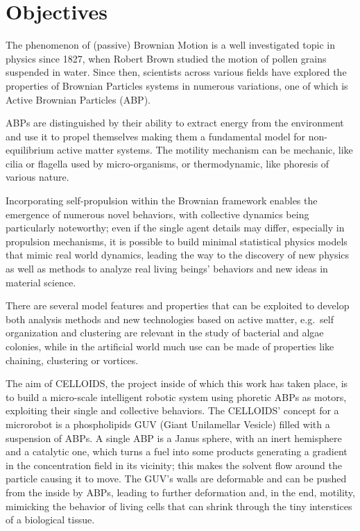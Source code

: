 \documentclass[../main.tex]{subfiles}
\begin{document}
	\section{Objectives}
	
	The phenomenon of (passive) Brownian Motion is a well investigated topic in physics since 1827, when Robert Brown studied the motion of pollen grains suspended in water.
	Since then, scientists across various fields have explored the properties of Brownian Particles systems in numerous variations, one of which is Active Brownian Particles (ABP). 
	
	ABPs are distinguished by their ability to extract energy from the environment and use it to propel themselves making them a fundamental model for non-equilibrium active matter systems.	
	The motility mechanism can be mechanic, like cilia or flagella used by micro-organisms, or thermodynamic, like phoresis of various nature. 
	
	Incorporating self-propulsion within the Brownian framework enables the emergence of numerous novel behaviors, with collective dynamics being particularly noteworthy; even if the single agent details may differ, especially in propulsion mechanisms, it is possible to build minimal statistical physics models that mimic real world dynamics, leading the way to the discovery of new physics as well as methods to analyze real living beings' behaviors and new ideas in material science. 
	
	There are several model features and properties that can be exploited to develop both analysis methods and new technologies based on active matter, e.g.\ self organization and clustering are relevant in the study of bacterial and algae colonies, while in the artificial world much use can be made of properties like chaining, clustering or vortices.
	
	The aim of CELLOIDS, the project inside of which this work has taken place, is to build a micro-scale intelligent robotic system using phoretic ABPs as motors, exploiting their single and collective behaviors. The CELLOIDS’ concept for a microrobot is a phospholipids GUV (Giant Unilamellar Vesicle) filled with a suspension of ABPs. A single ABP is a Janus sphere, with an inert hemisphere and a catalytic one, which turns a fuel into some products generating a gradient in the concentration field in its vicinity; this makes the solvent flow around the particle causing it to move. The GUV’s walls are deformable and can be pushed from the inside by ABPs, leading to further deformation and, in the end, motility, mimicking the behavior of living cells that can shrink through the tiny interstices of a biological tissue. 
	
\end{document}
